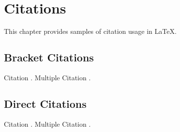 

\chapter{Citations} \label{citations}

This chapter provides samples of citation usage in LaTeX.

\section{Bracket Citations} \label{bracket-citations}

Citation \citep{lastnamep:yearp}. Multiple Citation \citep{lastnamep:yearp,lastnamee:yeare,lastnamea:yeara}.

\section{Direct Citations} \label{direct-citations}

Citation \citet{lastnamep:yearp}. Multiple Citation \citet{lastnamep:yearp,lastnamee:yeare,lastnamea:yeara}.
